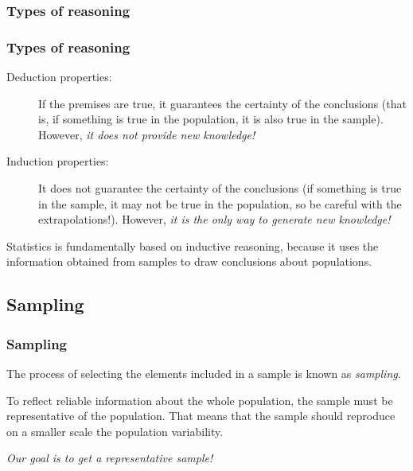 \begin{frame}
\frametitle{Types of reasoning}

\begin{center}
\resizebox{0.5\textwidth}{!}{}
\end{center}
\end{frame}


\begin{frame}
\frametitle{Types of reasoning}
\begin{description}
\item [Deduction properties:] If the premises are true, it guarantees the certainty of the conclusions (that is, if something is true in the population, it is also true in the sample).
However, \alert{\emph{it does not provide new knowledge!}}
\item [Induction properties:] It does not guarantee the certainty of the conclusions (if something is true in the sample, it may not be true in the population, so be careful with the extrapolations!).
However, \alert{\emph{it is the only way to generate new knowledge!}}
\end{description}

Statistics is fundamentally based on inductive reasoning, because it uses the information obtained from samples to draw conclusions about populations.
\end{frame}


\subsection{Sampling}
\begin{frame}
\frametitle{Sampling}
\begin{definition}[Sampling]
The process of selecting the elements included in a sample is known as \emph{sampling}.
\end{definition}
\begin{center}
\resizebox{0.8\textwidth}{!}{}
\end{center}

To reflect reliable information about the whole population, the sample must be representative of the population.
That means that the sample should reproduce on a smaller scale the population variability.

\begin{center}
\alert{\emph{Our goal is to get a representative sample!}}
\end{center}
\end{frame}


